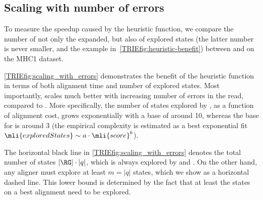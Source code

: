 \subsection{Scaling with number of errors}
To measure the speedup caused by the heuristic function, we compare the number
of not only the expanded, but also of explored states (the latter number is
never smaller, and the example in~\cref{TRIEfig:heuristic-benefit}) between
\astarix and \dijkstra on the MHC1 dataset.

\cref{TRIEfig:scaling_with_errors} demonstrates the benefit of the heuristic
function in terms of both alignment time and number of explored states. Most
importantly, \astarix scales much better with increasing number of errors in the
read, compared to \dijkstra. More specifically, the number of states explored by
\dijkstra, as a function of alignment cost, grows exponentially with a base of 
around 10, whereas the base for \astarix is around 3 (the empirical complexity is
estimated as a best exponential fit \mbox{$\mli{exploredStates} \sim a \cdot
\mli{score}^b$}).

The horizontal black line in \cref{TRIEfig:scaling_with_errors} denotes the total
number of states $\lvert \RG \rvert \cdot \lvert q \rvert$, which is always
explored by \bitparallel and \pasgal. On the other hand, any aligner must
explore at least $m = \lvert q \rvert$ states, which we show as a horizontal
dashed line. This lower bound is determined by the fact that at least the states
on a best alignment need to be explored.

